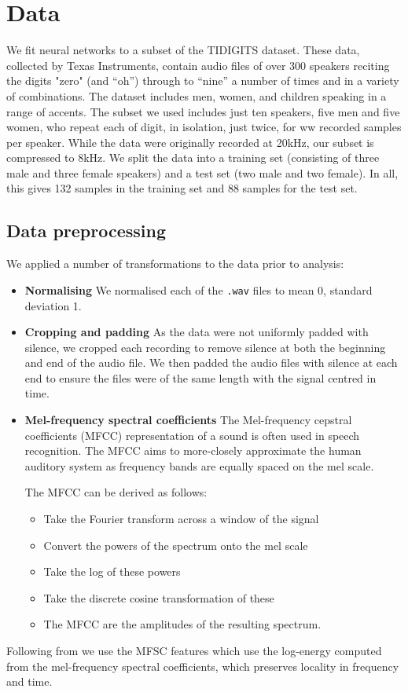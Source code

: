 \section{Data}
We fit neural networks to a subset of the TIDIGITS dataset. These data, collected by Texas Instruments, contain audio files of over 300 speakers reciting the digits "zero" (and ``oh'') through to ``nine'' a number of times and in a variety of combinations. The dataset includes men, women, and children speaking in a range of accents. The subset we used includes just ten speakers, five men and five women, who repeat each of digit, in isolation, just twice, for ww recorded samples per speaker. While the data were originally recorded at 20kHz, our subset is compressed to 8kHz. We split the data into a training set (consisting of three male and three female speakers) and a test set (two male and two female). In all, this gives 132 samples in the training set and 88 samples for the test set.

 

\subsection{Data preprocessing}
We applied a number of transformations to the data prior to analysis:
\begin{itemize}
\item \textbf{Normalising} We normalised each of the \texttt{.wav} files to mean 0, standard deviation 1.

\item \textbf{Cropping and padding} As the data were not uniformly padded with silence, we cropped each recording to remove silence at both the beginning and end of the audio file. We then padded the audio files with silence at each end to ensure the files were of the same length with the signal centred in time.

\item \textbf{Mel-frequency spectral coefficients}
The Mel-frequency cepstral coefficients (MFCC) representation of a sound is often used in speech recognition. The MFCC aims to more-closely approximate the human auditory system as frequency bands are equally spaced on the mel scale. 

The MFCC can be derived as follows:
\begin{itemize}
\item Take the Fourier transform across a window of the signal
\item Convert the powers of the spectrum onto the mel scale
\item Take the log of these powers
\item Take the discrete cosine transformation of these
\item The MFCC are the amplitudes of the resulting spectrum.
\end{itemize}
\end{itemize}

Following from \cite{abdel2014convolutional} we use the MFSC features which use the log-energy computed from the mel-frequency spectral coefficients, which preserves locality in frequency and time.


